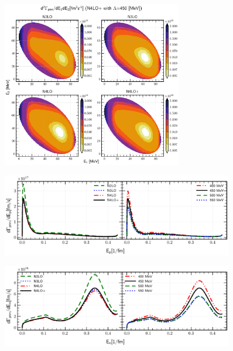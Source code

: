     \begin{figure}[h]
        \begin{center}
        \includegraphics[width=0.7\textwidth]{PlotData/PION/Dalitz_maps/figures/Dalitz_map_pnn_E1E2_orders.pdf}
        \end{center}
        \caption{}
        \label{pion_map_E1E2_order}
    \end{figure}

    \begin{figure}[h]
        \begin{center}
        \includegraphics[width=0.9\textwidth]{PlotData/PION/Dalitz_maps/figures/3HE_dGdEp.pdf}
        \end{center}
        \caption{}
        \label{pion_GdEp}
    \end{figure}

    \begin{figure}[h]
        \begin{center}
        \includegraphics[width=0.9\textwidth]{PlotData/PION/Dalitz_maps/figures/3HE_dGdEn.pdf}
        \end{center}
        \caption{}
        \label{pion_dGdEn}
    \end{figure}

